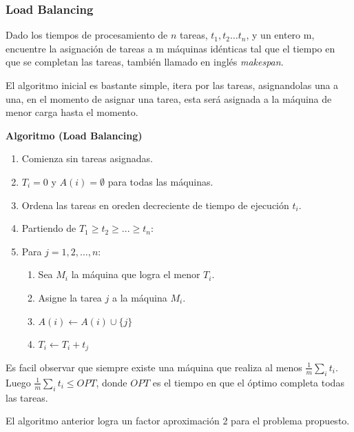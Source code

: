 \documentclass[../np-approximations.tex]{subfiles}
\begin{document}
\subsubsection{Load Balancing}

\begin{statement}
	Dado los tiempos de procesamiento de $n$ tareas, $t_1, t_2 \dots
	t_n$, y un entero m, encuentre la asignación de tareas a m
	máquinas idénticas tal que el tiempo en que se completan las 
	tareas, también llamado en inglés \emph{makespan}.
\end{statement}

El algoritmo inicial es bastante simple, itera por las tareas,
asignandolas una a una, en el momento de asignar una tarea, esta
será asignada a la máquina de menor carga hasta el momento.

\bigskip
\begin{tcolorbox}
	\textbf{Algoritmo (Load Balancing)}
	\begin{enumerate}
		\item Comienza sin tareas asignadas.
		\item $T_i=0$ y $A(i)=\emptyset$ para todas las máquinas.
		\item Ordena las tareas en oreden decreciente de tiempo de ejecución $t_i$.
		\item Partiendo de $T_1\ge t_2\ge ...\ge t_n$:
		\item Para $j=1,2,\dots,n$:
		      \begin{enumerate}
		      	\item Sea $M_i$ la máquina que logra el menor $T_i$.
		      	\item Asigne la tarea $j$ a la máquina $M_i$.
		      	\item $A(i) \leftarrow A(i) \cup \{j\}$
		      	\item $T_i \leftarrow T_i + t_j$
		      \end{enumerate}
	\end{enumerate}
\end{tcolorbox}
\bigskip

Es facil observar que siempre existe una máquina que realiza al 
menos $\frac {1}{m}\sum_i t_i$. Luego $\frac {1}{m}\sum_i 
t_i \le OPT$, donde $OPT$ es el tiempo en que el óptimo completa 
todas las tareas.

\begin{theorem}
	El algoritmo anterior logra un factor aproximación 2 para el 
	problema propuesto.
\end{theorem}
\end{document}
